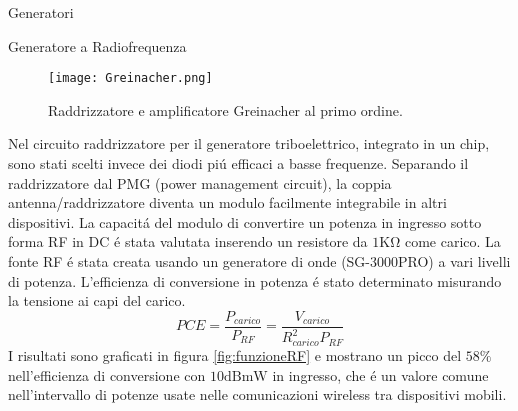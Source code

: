 \begin{section}{Generatori}
\begin{subsection}{Generatore a Radiofrequenza}
        \begin{figure}[H]
            \texttt{[image: Greinacher.png]}
            \centering
            \caption{Raddrizzatore e amplificatore Greinacher al primo ordine.}
            \label{fig:Greinacher}
        \end{figure}
        
        Nel circuito raddrizzatore per il generatore triboelettrico, integrato in un chip, sono stati scelti invece dei diodi pi\'u efficaci a basse frequenze. Separando il raddrizzatore dal PMG (power management circuit), la coppia antenna/raddrizzatore diventa un modulo facilmente integrabile in altri dispositivi. La capacit\'a del modulo di convertire un potenza in ingresso sotto forma RF in DC \'e stata valutata inserendo un resistore da \(1\mathrm{K\Omega}\) come carico. La fonte RF \'e stata creata usando un generatore di onde (SG-3000PRO) a vari livelli di potenza. L'efficienza di conversione in potenza \'e stato determinato misurando la tensione ai capi del carico. 
        \begin{equation*}
            PCE = \frac{P_{carico}}{P_{RF}} = \frac{V_{carico}}{R_{carico}^2P_{RF}}
        \end{equation*}
        I risultati sono graficati in figura \ref{fig:funzioneRF} e mostrano un picco del \(58\%\) nell'efficienza di conversione con \(10\mathrm{dBmW}\) in ingresso, che \'e un valore comune nell'intervallo di potenze usate nelle comunicazioni wireless tra dispositivi mobili. 
    \end{subsection}
\end{section}

